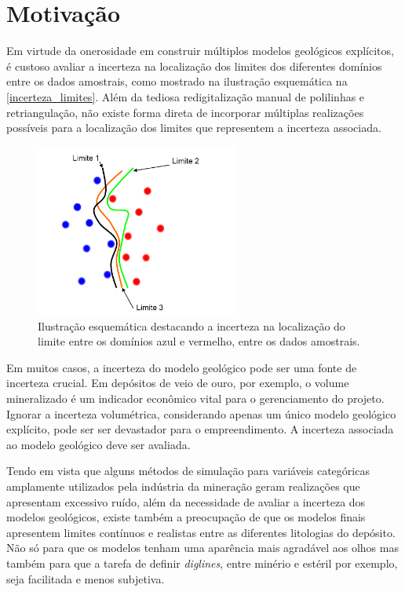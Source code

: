 \section{Motivação}

Em virtude da onerosidade em construir múltiplos modelos geológicos explícitos, é custoso avaliar a incerteza na localização dos limites dos diferentes domínios entre os dados amostrais, como mostrado na ilustração esquemática na \autoref{incerteza_limites}. Além da tediosa redigitalização manual de polilinhas e retriangulação, não existe forma direta de incorporar múltiplas realizações possíveis para a localização dos limites que representem a incerteza associada.

\begin{figure}[H]
    \centering
	\caption{\label{incerteza_limites}Ilustração esquemática destacando a incerteza na localização do limite entre os domínios azul e vermelho, entre os dados amostrais.}
	\includegraphics[width=0.6\textwidth]{capitulo_1/imagens/incerteza_limites}
\end{figure}

Em muitos casos, a incerteza do modelo geológico pode ser uma fonte de incerteza crucial. Em depósitos de veio de ouro, por exemplo, o volume mineralizado é um indicador econômico vital para o gerenciamento do projeto. Ignorar a incerteza volumétrica, considerando apenas um único modelo geológico explícito, pode ser ser devastador para o empreendimento. A incerteza associada ao modelo geológico deve ser avaliada.

Tendo em vista que alguns métodos de simulação para variáveis categóricas amplamente utilizados pela indústria da mineração geram realizações que apresentam excessivo ruído, além da necessidade de avaliar a incerteza dos modelos geológicos, existe também a preocupação de que os modelos finais apresentem limites contínuos e realistas entre as diferentes litologias do depósito. Não só para que os modelos tenham uma aparência mais agradável aos olhos mas também para que a tarefa de definir \textit{diglines}, entre minério e estéril por exemplo, seja facilitada e menos subjetiva.

